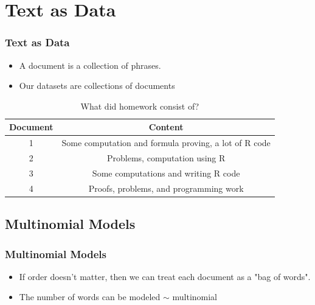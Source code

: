 \documentclass{beamer}
\begin{document}
\section{Text as Data }
\begin{frame}
 \frametitle{Text as Data}
 \begin{itemize}
\pause
\item A document is a collection of phrases. 
\pause
\item Our datasets are collections of documents
\end{itemize}
\pause
\begin{table}[!hbpt]
\caption{What did homework consist of?} \label{tab:title}
\pause
\begin{center}
\begin{tabular} {c c}
\textbf{Document} & \textbf{Content} \\
\hline
1 & Some computation and formula proving, a lot of R code \\
2 & Problems, computation using R \\
3 & Some computations and writing R code\\
4 & Proofs, problems, and programming work \\
\end{tabular}
\end{center}
\end{table}
\end{frame}

\subsection[Basic Structure]{Multinomial Models}
\begin{frame}
\pause
\frametitle{Multinomial Models}
\begin{itemize}
\item If order doesn't matter, then we can treat each document as a "bag of words". 
\pause
\item The number of words can be modeled $\sim$ multinomial
\pause
\end{itemize}
\begin{table}[!hbpt]
\caption{Creating a word-count matrix from text}
\begin{center}
\end{center}
\end{table} 
\pause
\end{frame}
\end{document}
